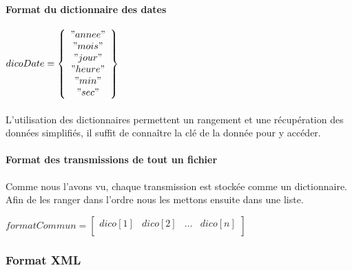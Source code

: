 \documentclass[11p, a4papert]{article}
\begin{document}
\paragraph{Format du dictionnaire des dates}
\begin{center}
$dicoDate = \left\{\begin{array}{c} "annee" \\"mois" \\"jour" \\"heure" \\"min" \\"sec" \\ \end{array}\right\}$
\end{center}

\paragraph{}
L'utilisation des dictionnaires permettent un rangement et une récupération des données simplifiés, il suffit de connaître la clé de la donnée pour y accéder.

\paragraph{Format des transmissions de tout un fichier}
Comme nous l'avons vu, chaque transmission est stockée comme un dictionnaire. Afin de les ranger dans l'ordre nous les mettons ensuite dans une liste. 

\begin{center}
$formatCommun = \left[\begin{array}{cccc} dico[1] & dico[2] & ... & dico[n] \\ \end{array}\right]$
\end{center}

\subsubsection{Format XML}
\end{document}
